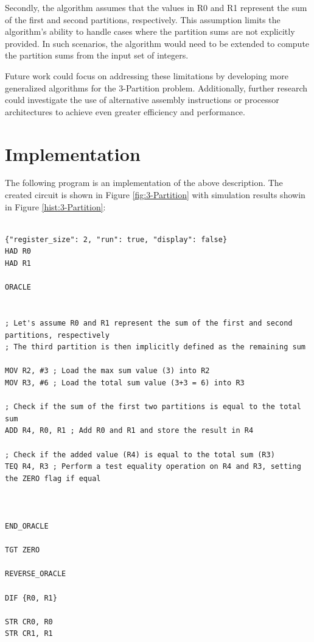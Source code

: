 Secondly, the algorithm assumes that the values in R0 and R1 represent the sum of the first and second partitions, respectively. This assumption limits the algorithm's ability to handle cases where the partition sums are not explicitly provided. In such scenarios, the algorithm would need to be extended to compute the partition sums from the input set of integers.

Future work could focus on addressing these limitations by developing more generalized algorithms for the 3-Partition problem. Additionally, further research could investigate the use of alternative assembly instructions or processor architectures to achieve even greater efficiency and performance.



\section{Implementation}

The following program is an implementation of the above description. The created circuit is shown in Figure \ref{fig:3-Partition} with simulation results showin in Figure \ref{hist:3-Partition}:

\begin{lstlisting}

{"register_size": 2, "run": true, "display": false}
HAD R0
HAD R1

ORACLE


; Let's assume R0 and R1 represent the sum of the first and second partitions, respectively
; The third partition is then implicitly defined as the remaining sum

MOV R2, #3 ; Load the max sum value (3) into R2
MOV R3, #6 ; Load the total sum value (3+3 = 6) into R3

; Check if the sum of the first two partitions is equal to the total sum
ADD R4, R0, R1 ; Add R0 and R1 and store the result in R4

; Check if the added value (R4) is equal to the total sum (R3)
TEQ R4, R3 ; Perform a test equality operation on R4 and R3, setting the ZERO flag if equal



END_ORACLE

TGT ZERO

REVERSE_ORACLE

DIF {R0, R1}

STR CR0, R0
STR CR1, R1


\end{lstlisting}

